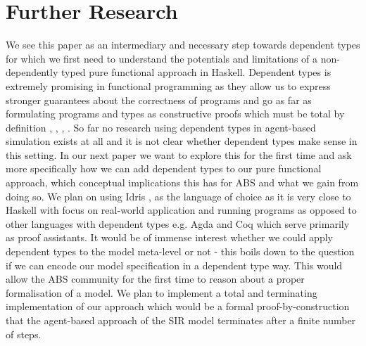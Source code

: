 \section{Further Research}
We see this paper as an intermediary and necessary step towards dependent types for which we first need to understand the potentials and limitations of a non-dependently typed pure functional approach in Haskell. Dependent types is extremely promising in functional programming as they allow us to express stronger guarantees about the correctness of programs and go as far as formulating programs and types as constructive proofs \cite{wadler_propositions_2015} which must be total by definition \cite{thompson_type_1991}, \cite{altenkirch_why_2005}, \cite{altenkirch_pi_sigma:_2010}, \cite{program_homotopy_2013}. So far no research using dependent types in agent-based simulation exists at all and it is not clear whether dependent types make sense in this setting. In our next paper we want to explore this for the first time and ask more specifically how we can add dependent types to our pure functional approach, which conceptual implications this has for ABS and what we gain from doing so. We plan on using Idris \cite{brady_idris_2013}, \cite{brady_type-driven_2017} as the language of choice as it is very close to Haskell with focus on real-world application and running programs as opposed to other languages with dependent types e.g. Agda and Coq which serve primarily as proof assistants.
It would be of immense interest whether we could apply dependent types to the model meta-level or not - this boils down to the question if we can encode our model specification in a dependent type way. This would allow the ABS community for the first time to reason about a proper formalisation of a model. We plan to implement a total and terminating implementation of our approach which would be a formal proof-by-construction that the agent-based approach of the SIR model terminates after a finite number of steps.